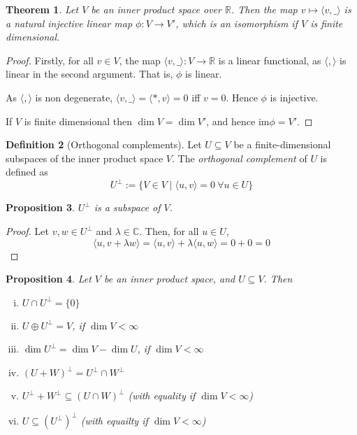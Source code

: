 \documentclass[10pt,fleqn]{article}
\newcommand{\im}{\mathrm{im}}
\newcommand{\comps}{\mathbb{C}}
\newcommand{\reals}{\mathbb{R}}
\theoremstyle{definition} \newtheorem{defn}{Definition}[section]
\theoremstyle{plain}      \newtheorem{thm}[defn]{Theorem}
\theoremstyle{plain}      \newtheorem{prop}[defn]{Proposition}
\theoremstyle{plain}      \newtheorem{lem}[defn]{Lemma}
\theoremstyle{plain}      \newtheorem{cor}[defn]{Corollary}
\theoremstyle{plain}      \newtheorem{ad}[defn]{Addendum}
\theoremstyle{definition} \newtheorem{ex}[defn]{Example}
\theoremstyle{definition} \newtheorem{rem}[defn]{Remark}
\numberwithin{equation}{subsection}
\begin{document}
\begin{thm}
    Let $V$ be an inner product space over $\reals$.
    Then the map $v\mapsto\langle v,\_\rangle$ is a natural injective linear map $\phi:V\to V'$, which is an isomorphism if $V$ is finite dimensional.
\end{thm}

\begin{proof}
    Firstly, for all $v\in V$, the map $\langle v,\_\rangle:V\to\reals$ is a linear functional, as $\langle,\rangle$ is linear in the second argument.
    That is, $\phi$ is linear.

    As $\langle,\rangle$ is non degenerate, $\langle v,\_\rangle=\langle*,v\rangle=0$ iff $v=0$.
    Hence $\phi$ is injective.

    If $V$ is finite dimensional then $\dim V=\dim V'$, and hence $\im\phi=V'$.
\end{proof}

\begin{defn}[Orthogonal complements]
    Let $U\subseteq V$ be a finite-dimensional subspaces of the inner product space $V$.
    The \emph{orthogonal complement} of $U$ is defined as
    \[
        U^{\perp}:=
        \{V\in V\mid \langle u,v\rangle=0~\forall u\in U\}
    \]
\end{defn}

\begin{prop}
    $U^{\perp}$ is a subspace of $V$.
\end{prop}

\begin{proof}
    Let $v,w\in U^{\perp}$ and $\lambda\in\comps$.
    Then, for all $u\in U$,
    \[
        \langle u,v+\lambda w\rangle=
        \langle u,v\rangle+\lambda\langle u,w\rangle=
        0+0=
        0
    \]
\end{proof}

\begin{prop}
    Let $V$ be an inner product space, and $U\subseteq V$.
    Then
    \begin{enumerate}[(i)]
        \item $U\cap U^{\perp}=\{0\}$
        \item $U\oplus U^{\perp}=V$, if $\dim V<\infty$
        \item $\dim U^{\perp}=\dim V-\dim U$, if $\dim V<\infty$
        \item $(U+W)^{\perp}=U^{\perp}\cap W^{\perp}$
        \item $U^{\perp}+W^{\perp}\subseteq(U\cap W)^{\perp}$ (with equality if $\dim V<\infty$)
        \item $U\subseteq(U^{\perp})^{\perp}$ (with equailty if $\dim V<\infty$)
    \end{enumerate}
\end{prop}
\end{document}

